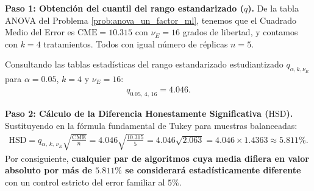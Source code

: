 \begin{solproblema}
	\textbf{Paso 1: Obtención del cuantil del rango estandarizado ($q$).}
	De la tabla ANOVA del Problema \ref{prob:anova_un_factor_ml}, tenemos que el Cuadrado Medio del Error es $\text{CME} = 10.315$ con $\nu_E = 16$ grados de libertad, y contamos con $k = 4$ tratamientos. Todos con igual número de réplicas $n = 5$.
	
	Consultando las tablas estadísticas del rango estandarizado estudiantizado $q_{\alpha, k, \nu_E}$ para $\alpha = 0.05$, $k = 4$ y $\nu_E = 16$:
	\begin{align}
		q_{0.05, \, 4, \, 16} = 4.046.
	\end{align}
	
	\textbf{Paso 2: Cálculo de la Diferencia Honestamente Significativa ($\text{HSD}$).}
	Sustituyendo en la fórmula fundamental de Tukey para muestras balanceadas:
	\begin{align}
		\text{HSD} = q_{\alpha, \, k, \, \nu_E} \sqrt{\frac{\text{CME}}{n}} = 4.046 \sqrt{\frac{10.315}{5}} = 4.046 \sqrt{2.063} = 4.046 \times 1.4363 \approx 5.811\%.
	\end{align}
	Por consiguiente, \textbf{cualquier par de algoritmos cuya media difiera en valor absoluto por más de $5.811\%$ se considerará estadísticamente diferente} con un control estricto del error familiar al $5\%$.
	

\end{solproblema}
